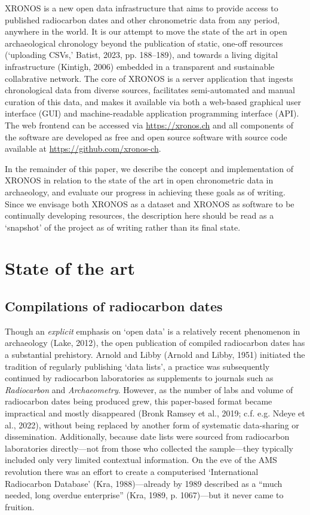\documentclass[
  number,
  review]{elsarticle}
\begin{document}
XRONOS is a new open data infrastructure that aims to provide access to
published radiocarbon dates and other chronometric data from any period,
anywhere in the world. It is our attempt to move the state of the art in
open archaeological chronology beyond the publication of static, one-off
resources (`uploading CSVs,' Batist, 2023, pp. 188--189), and towards a
living digital infrastructure (Kintigh, 2006) embedded in a transparent
and sustainable collabrative network. The core of XRONOS is a server
application that ingests chronological data from diverse sources,
facilitates semi-automated and manual curation of this data, and makes
it available via both a web-based graphical user interface (GUI) and
machine-readable application programming interface (API). The web
frontend can be accessed via \url{https://xronos.ch} and all components
of the software are developed as free and open source software with
source code available at \url{https://github.com/xronos-ch}.

In the remainder of this paper, we describe the concept and
implementation of XRONOS in relation to the state of the art in open
chronometric data in archaeology, and evaluate our progress in achieving
these goals as of writing. Since we envisage both XRONOS as a dataset
and XRONOS as software to be continually developing resources, the
description here should be read as a `snapshot' of the project as of
writing rather than its final state.

\section{State of the art}\label{state-of-the-art}

\subsection{Compilations of radiocarbon
dates}\label{sec-c14-compilation}

Though an \emph{explicit} emphasis on `open data' is a relatively recent
phenomenon in archaeology (Lake, 2012), the open publication of compiled
radiocarbon dates has a substantial prehistory. Arnold and Libby (Arnold
and Libby, 1951) initiated the tradition of regularly publishing `data
lists', a practice was subsequently continued by radiocarbon
laboratories as supplements to journals such as \emph{Radiocarbon} and
\emph{Archaeometry}. However, as the number of labs and volume of
radiocarbon dates being produced grew, this paper-based format became
impractical and mostly disappeared (Bronk Ramsey et al., 2019; c.f. e.g.
Ndeye et al., 2022), without being replaced by another form of
systematic data-sharing or dissemination. Additionally, because date
lists were sourced from radiocarbon laboratories directly---not from
those who collected the sample---they typically included only very
limited contextual information. On the eve of the AMS revolution there
was an effort to create a computerised `International Radiocarbon
Database' (Kra, 1988)---already by 1989 described as a ``much needed,
long overdue enterprise'' (Kra, 1989, p. 1067)---but it never came to
fruition.
\end{document}
